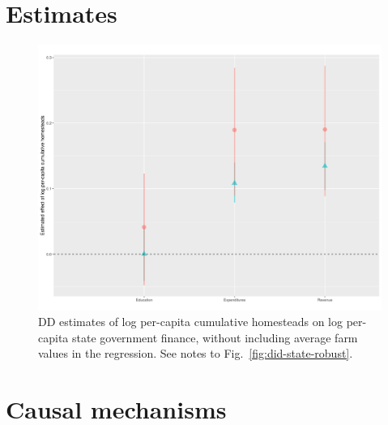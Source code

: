 \documentclass[12pt]{article}
\begin{document}
\pagebreak
\section{Estimates}


\begin{figure}[htbp]
\begin{center}
		\includegraphics[width=\textwidth]{plots/did-state.png}
\end{center}
\caption{DD estimates of log per-capita cumulative homesteads on log per-capita state government finance, without including average farm values in the regression. See notes to Fig.~\ref{fig:did-state-robust}. \label{fig:did-state}}
\end{figure}	

\pagebreak
\section{Causal mechanisms}
\end{document}
